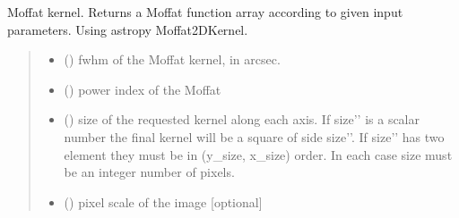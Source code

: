 \documentclass[letterpaper,10pt,english]{sphinxmanual}
\begin{document}

\begin{fulllineitems}
\label{\detokenize{api/pymusepipe:pymusepipe.cube_convolve.moffat_kernel}}
\pysigstartsignatures
{}
\pysigstopsignatures
\sphinxAtStartPar
Moffat kernel. Returns a Moffat function array according to given
input parameters. Using astropy Moffat2DKernel.
\begin{quote}\begin{description}
\begin{itemize}
\item {} 
\sphinxAtStartPar
{} () \textendash{} fwhm of the Moffat kernel, in arcsec.

\item {} 
\sphinxAtStartPar
{} () \textendash{} power index of the Moffat

\item {} 
\sphinxAtStartPar
{} () \textendash{} size of the requested kernel along each axis.
If {\color{red}\bfseries{}\textasciigrave{}\textasciigrave{}}size’’ is a scalar number the final kernel will be a square of
side {\color{red}\bfseries{}\textasciigrave{}\textasciigrave{}}size’’. If {\color{red}\bfseries{}\textasciigrave{}\textasciigrave{}}size’’ has two element they must be in
(y\_size, x\_size) order. In each case size must be an integer
number of pixels.

\item {} 
\sphinxAtStartPar
{} () \textendash{} pixel scale of the image {[}optional{]}

\end{itemize}

\end{description}\end{quote}

\end{fulllineitems}
\end{document}
